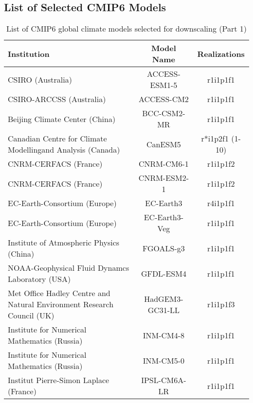 \documentclass[]{scrartcl}
\begin{document}
\clearpage

\begin{appendices}

\section{List of Selected CMIP6 Models}\label{cmip6_list}

\begin{table}[ht]
	\caption{List of CMIP6 global climate models selected for downscaling (Part 1)}\label{table:gcm1}
	\begin{center}
	\begin{tabularx}{\linewidth}{|L|cc|} 
			\hline
			\textbf{Institution} & \textbf{Model Name} & \textbf{Realizations}  \\
			\hline
			CSIRO (Australia)                     & ACCESS-ESM1-5 & r1i1p1f1   \\
			CSIRO-ARCCSS (Australia) & ACCESS-CM2 & r1i1p1f1 \\
		    Beijing Climate Center (China) & BCC-CSM2-MR & r1i1p1f1  \\
		    Canadian Centre for Climate Modelling\newline and Analysis (Canada) & CanESM5 & r*i1p2f1 (1-10) \\
			CNRM-CERFACS (France) & CNRM-CM6-1 & r1i1p1f2 \\  	
			CNRM-CERFACS (France) & CNRM-ESM2-1 & r1i1p1f2 \\	  
			EC-Earth-Consortium (Europe) & EC-Earth3 & r4i1p1f1 \\
			EC-Earth-Consortium (Europe) & EC-Earth3-Veg & r1i1p1f1 \\	  
			Institute of Atmospheric Physics (China) & FGOALS-g3 & r1i1p1f1 \\
			NOAA-Geophysical Fluid Dynamcs Laboratory (USA) & GFDL-ESM4 & r1i1p1f1 \\
			Met Office Hadley Centre and \newline Natural Environment Research Council (UK) & HadGEM3-GC31-LL & r1i1p1f3 \\
			Institute for Numerical Mathematics (Russia) & INM-CM4-8 & r1i1p1f1 \\
			Institute for Numerical Mathematics (Russia) & INM-CM5-0 & r1i1p1f1 \\	
			Institut Pierre-Simon Laplace (France) & IPSL-CM6A-LR & r1i1p1f1 \\	
			\hline
		\end{tabularx}
	\end{center}
\end{table}


\end{appendices}
\end{document}
